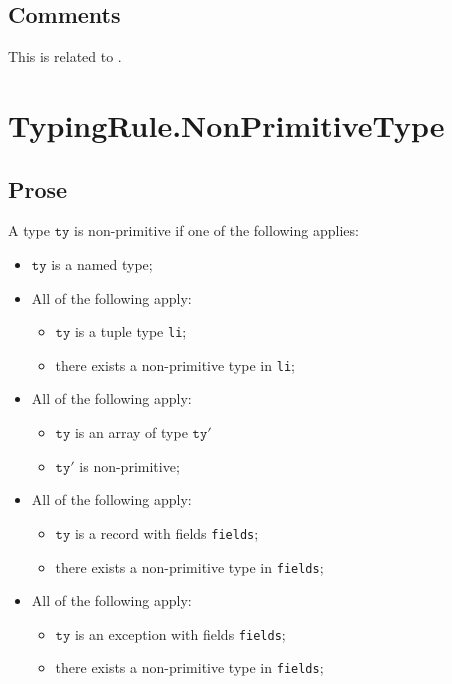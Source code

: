 \documentclass{book}
\newcommand\tty[0]{\texttt{ty}}
\begin{document}
    \subsection{Comments}
    This is related to .

\newcommand\vtp[0]{\texttt{t}'}

\section{TypingRule.NonPrimitiveType}

    \subsection{Prose}
    A type $\tty$ is non-primitive if one of the following applies:
    \begin{itemize}
    \item $\tty$ is a named type;
    \item All of the following apply:
      \begin{itemize}
      \item $\tty$ is a tuple type \texttt{li};
      \item there exists a non-primitive type in \texttt{li};
      \end{itemize}
    \item All of the following apply:
      \begin{itemize}
      \item $\tty$ is an array of type $\tty'$
      \item $\tty'$ is non-primitive;
      \end{itemize}
    \item All of the following apply:
      \begin{itemize}
      \item $\tty$ is a record with fields \texttt{fields};
      \item there exists a non-primitive type in \texttt{fields};
      \end{itemize}
    \item All of the following apply:
      \begin{itemize}
      \item $\tty$ is an exception with fields \texttt{fields};
      \item there exists a non-primitive type in \texttt{fields};
      \end{itemize}
    \end{itemize}
\end{document}
